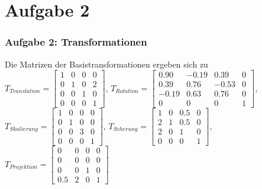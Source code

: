 \documentclass[accentcolor=tud9c,colorbacktitle,inverttitle,landscape,german,presentation,t]{tudbeamer}
\begin{document}
\section{Aufgabe 2}
\begin{frame}
	\frametitle{Aufgabe 2: Transformationen}
	Die Matrizen der Basistransformationen ergeben sich zu
	$T_{Translation}=\begin{bmatrix}
	1 & 0 & 0 & 0\\
	0 & 1 & 0 & 2\\
	0 & 0 & 1 & 0\\
	0 & 0 & 0 & 1
	\end{bmatrix} $, 
	$T_{Rotation}=\begin{bmatrix}
	0.90 & -0.19 & 0.39 & 0\\
	0.39 & 0.76 & -0.53 & 0\\
	-0.19 & 0.63 & 0.76 & 0\\
	0 & 0 & 0 & 1
	\end{bmatrix} $, 
	$T_{Skalierung}=\begin{bmatrix}
	1 & 0 & 0 & 0\\
	0 & 1 & 0 & 0\\
	0 & 0 & 3 & 0\\
	0 & 0 & 0 & 1
	\end{bmatrix} $, 
	$T_{Scherung}=\begin{bmatrix}
	1 & 0 & 0.5 & 0\\
	2 & 1 & 0.5 & 0\\
	2 & 0 & 1 & 0\\
	0 & 0 & 0 & 1
	\end{bmatrix} $,
	 $T_{Projektion}=\begin{bmatrix}
	 0 & 0 & 0 & 0\\
	 0 & 0 & 0 & 0\\
	 0 & 0 & 1 & 0\\
	 0.5 & 2 & 0 & 1
	 \end{bmatrix} $\\

\end{frame}
\end{document}
